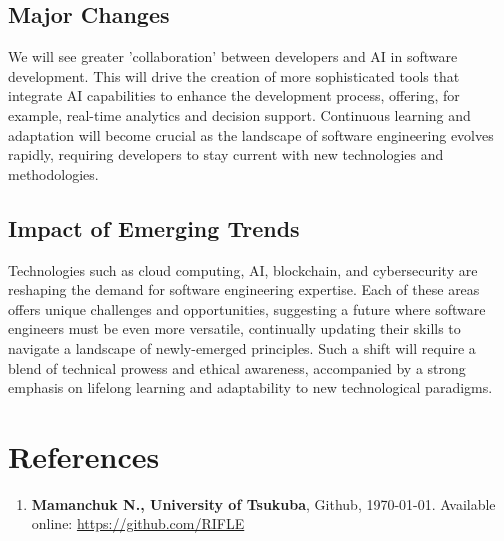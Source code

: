 \documentclass[12pt,a4paper]{article}
\begin{document}
\subsection{Major Changes}
We will see greater 'collaboration' between developers and AI in software development. This will drive the creation of more sophisticated tools that integrate AI capabilities to enhance the development process, offering, for example, real-time analytics and decision support. Continuous learning and adaptation will become crucial as the landscape of software engineering evolves rapidly, requiring developers to stay current with new technologies and methodologies.

\subsection{Impact of Emerging Trends}
Technologies such as cloud computing, AI, blockchain, and cybersecurity are reshaping the demand for software engineering expertise. Each of these areas offers unique challenges and opportunities, suggesting a future where software engineers must be even more versatile, continually updating their skills to navigate a landscape of newly-emerged principles. Such a shift will require a blend of technical prowess and ethical awareness, accompanied by a strong emphasis on lifelong learning and adaptability to new technological paradigms.



\section*{References}
\begin{enumerate}
    \item \textbf{Mamanchuk N., University of Tsukuba}, Github, \today. Available online: \url{https://github.com/RIFLE}
\end{enumerate}
\end{document}
